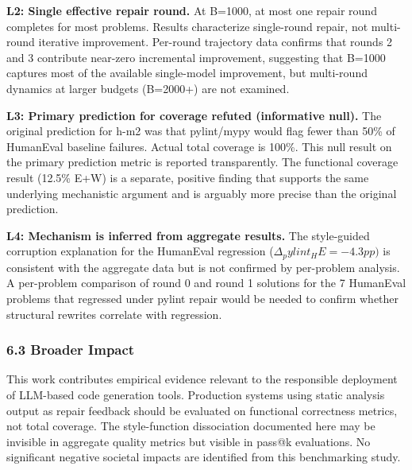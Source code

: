 \textbf{L2: Single effective repair round.} At B=1000, at most one repair round completes for most problems. Results characterize single-round repair, not multi-round iterative improvement. Per-round trajectory data confirms that rounds 2 and 3 contribute near-zero incremental improvement, suggesting that B=1000 captures most of the available single-model improvement, but multi-round dynamics at larger budgets (B=2000+) are not examined.

\textbf{L3: Primary prediction for coverage refuted (informative null).} The original prediction for h-m2 was that pylint/mypy would flag fewer than 50\% of HumanEval baseline failures. Actual total coverage is 100\%. This null result on the primary prediction metric is reported transparently. The functional coverage result (12.5\% E+W) is a separate, positive finding that supports the same underlying mechanistic argument and is arguably more precise than the original prediction.

\textbf{L4: Mechanism is inferred from aggregate results.} The style-guided corruption explanation for the HumanEval regression ($\Delta _pylint_HE = -4.3pp)$ is consistent with the aggregate data but is not confirmed by per-problem analysis. A per-problem comparison of round 0 and round 1 solutions for the 7 HumanEval problems that regressed under pylint repair would be needed to confirm whether structural rewrites correlate with regression.

\subsubsection{6.3 Broader Impact}

This work contributes empirical evidence relevant to the responsible deployment of LLM-based code generation tools. Production systems using static analysis output as repair feedback should be evaluated on functional correctness metrics, not total coverage. The style-function dissociation documented here may be invisible in aggregate quality metrics but visible in pass@k evaluations. No significant negative societal impacts are identified from this benchmarking study.

